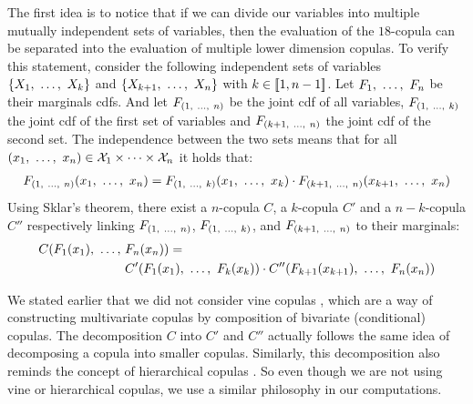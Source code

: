 The first idea is to notice that if we can divide our variables into multiple mutually independent sets of variables, then the evaluation of the $18$-copula can be separated into the evaluation of multiple lower dimension copulas. To verify this statement, consider the following independent sets of variables $\{X_1 , ~\ldots, ~ X_k\}$ and $\{X_{k+1} , ~\ldots, ~ X_n\}$ with $k\in[\![1,n-1]\!]$. Let $F_1 , ~\ldots, ~  F_n$ be their marginals \acrshort{cdf}s. And let $F_{(1 , ~\ldots, ~ n)}$ be the joint \acrshort{cdf} of all variables, $F_{(1 , ~\ldots, ~ k)}$ the joint \acrshort{cdf} of the first set of variables and $F_{(k+1 , ~\ldots, ~ n)}$ the joint \acrshort{cdf} of the second set. The independence between the two sets means that for all $(x_1 , ~\ldots, ~ x_n)\in\mathcal{X}_1\times\dots\times\mathcal{X}_n$ it holds that:
\begin{align*}
    F_{(1 , ~\ldots, ~ n)}(x_1 , ~\ldots, ~ x_n) = F_{(1 , ~\ldots, ~ k)}(x_1 , ~\ldots, ~ x_k)\cdot F_{(k+1 , ~\ldots, ~ n)}(x_{k+1} , ~\ldots, ~ x_n)
\end{align*}
Using Sklar's theorem, there exist a $n$-copula $C$, a $k$-copula $C'$ and a $n-k$-copula $C''$ respectively linking $F_{(1 , ~\ldots, ~ n)}$, $F_{(1 , ~\ldots, ~ k)}$, and $F_{(k+1 , ~\ldots, ~ n)}$ to their marginals:
\begin{align}
    C(F_1(x_1) , ~\ldots, ~& F_n(x_n)) =\nonumber\\
    &C'(F_1(x_1) , ~\ldots, ~ F_k(x_k))\cdot C''(F_{k+1}(x_{k+1}) , ~\ldots, ~ F_n(x_n))\label{eq:copula_factorizing}
\end{align}

\begin{remark}
    We stated earlier that we did not consider vine copulas \cite{czado_vine_2022}, which are a way of constructing multivariate copulas by composition of bivariate (conditional) copulas. The decomposition $C$ into $C'$ and $C''$ actually follows the same idea of decomposing a copula into smaller copulas. Similarly, this decomposition also reminds the concept of hierarchical copulas \cite{joe_multivariate_1997}. So even though we are not using vine or hierarchical copulas, we use a similar philosophy in our computations.
\end{remark}

